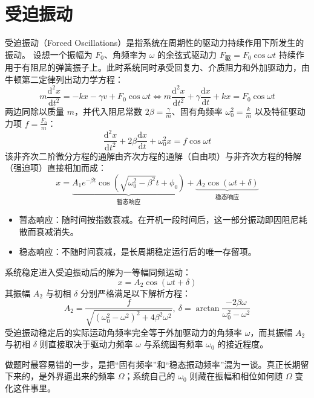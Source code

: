 
\section{受迫振动}

\begin{definition}[受迫振动]
受迫振动（Forced Oscillations）是指系统在周期性的驱动力持续作用下所发生的振动。
设想一个振幅为 $F_0$、角频率为 $\omega$ 的余弦式驱动力 $F_{\text{驱}} = F_0 \cos \omega t$ 持续作用于有阻尼的弹簧振子上。此时系统同时承受回复力、介质阻力和外加驱动力，由牛顿第二定律列出动力学方程：$$m \frac{\mathrm{d}^2x}{\mathrm{d}t^2} = -kx - \gamma v + F_0 \cos \omega t\Longleftrightarrow m \frac{\mathrm{d}^2x}{\mathrm{d}t^2} + \gamma \frac{\mathrm{d}x}{\mathrm{d}t} + kx = F_0 \cos \omega t$$
两边同除以质量 $m$，并代入阻尼常数 $2\beta = \frac{\gamma}{m}$、固有角频率 $\omega_0^2 = \frac{k}{m}$ 以及特征驱动力项 $f = \frac{F_0}{m}$：$$\boxed{\frac{\mathrm{d}^2x}{\mathrm{d}t^2} + 2\beta \frac{\mathrm{d}x}{\mathrm{d}t} + \omega_0^2 x = f \cos \omega t}$$该非齐次二阶微分方程的通解由齐次方程的通解（自由项）与非齐次方程的特解（强迫项）直接相加而成：$$x = \underbrace{A_1 e^{-\beta t} \cos\left( \sqrt{\omega_0^2 - \beta^2} t + \phi_0 \right)}_{\text{暂态响应}} + \underbrace{A_2 \cos(\omega t + \delta)}_{\text{稳态响应}}$$
\begin{itemize}
\item 暂态响应：随时间按指数衰减。在开机一段时间后，这一部分振动即因阻尼耗散而衰减消失。
\item 稳态响应：不随时间衰减，是长周期稳定运行后的唯一存留项。
\end{itemize}
系统稳定进入受迫振动后的解为一等幅同频运动：$$x = A_2 \cos(\omega t + \delta)$$其振幅 $A_2$ 与初相 $\delta$ 分别严格满足以下解析方程：$$\boxed{A_2 = \frac{f}{\sqrt{(\omega_0^2 - \omega^2)^2 + 4\beta^2 \omega^2}}},~\boxed{\delta = \arctan \frac{-2\beta \omega}{\omega_0^2 - \omega^2}}$$受迫振动稳定后的实际运动角频率完全等于外加驱动力的角频率 $\omega$，而其振幅 $A_2$ 与初相 $\delta$ 则直接取决于驱动力频率 $\omega$ 与系统固有频率 $\omega_0$ 的接近程度。
\end{definition}
\begin{remark}
做题时最容易错的一步，是把“固有频率”和“稳态振动频率”混为一谈。真正长期留下来的，是外界逼出来的频率 \(\Omega\)；系统自己的 \(\omega_0\) 则藏在振幅和相位如何随 \(\Omega\) 变化这件事里。
\end{remark}
